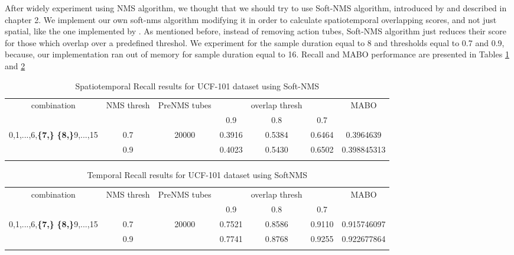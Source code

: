 After widely experiment using NMS algorithm, we thought that we should try to use Soft-NMS algorithm, introduced by \cite{DBLP:journals/corr/BodlaSCD17} and described in chapter 2. We implement our own soft-nms algorithm modifying it in order to calculate spatiotemporal overlapping
scores, and not just spatial, like the one implemented by \cite{DBLP:journals/corr/BodlaSCD17}. As mentioned before, instead of removing action tubes, Soft-NMS algorithm just reduces their score for those which overlap over a predefined threshol. We experiment for the sample duration
equal to 8 and thresholds equal to 0.7 and 0.9, because, our implementation ran out of memory for sample duration equal to 16.
Recall and MABO performance are presented in Tables \ref{table:ucf_softnms_recall} and \ref{table:ucf_softnms_temp_recall}

\begin{center}
  \setlength{\tabcolsep}{2pt}
\begin{longtable}{||c | c | c | c c c| c|}

  \hline
  \multirow{2}{*}{combination} & \multirow{2}{2.5em}{NMS thresh} & \multirow{2}{3.5em}{PreNMS tubes} &  {} &overlap thresh & {} & \multirow{2}{*}{MABO} \\
  {} & {} & {} &  0.9 &  0.8 & 0.7 & {}\\         
  \hline
  \multirow{2}{7em}{0,1,...,6,\textbf{\{7,\}}
  \textbf{\{8,\}}9,...,15 }  & 0.7 &\multirow{2}{*}{20000}  & 0.3916 & 0.5384 & 0.6464 & 0.3964639 \\
  \cline{2-2} \cline{4-7} 
  {} &  0.9   & {}   & 0.4023 & 0.5430 & 0.6502 & 0.398845313 \\
  \hline                                    

  \caption{Spatiotemporal Recall results for UCF-101 dataset using Soft-NMS}
  \label{table:ucf_softnms_recall}
\end{longtable} 
\end{center}

\begin{center}
  \setlength{\tabcolsep}{2.2pt}
\begin{longtable}{||c | c | c | c c c| c|}

  \hline
  \multirow{2}{*}{combination} & \multirow{2}{2.5em}{NMS thresh} & \multirow{2}{3.5em}{PreNMS tubes} &  {} &overlap thresh & {} & \multirow{2}{*}{MABO} \\
  {} & {} & {} &  0.9 &  0.8 & 0.7 & {}\\         
  \hline

  \multirow{2}{7em}{0,1,...,6,\textbf{\{7,\}}
    \textbf{\{8,\}}9,...,15 }  & 0.7 &\multirow{2}{*}{20000}  & 0.7521 & 0.8586 & 0.9110 & 0.915746097  \\
  \cline{2-2} \cline{4-7} 
  {} &  0.9   & {}   & 0.7741 & 0.8768 & 0.9255 & 0.922677864 \\
  \hline                                    

  \caption{Temporal Recall results for UCF-101 dataset using SoftNMS}
  \label{table:ucf_softnms_temp_recall}
\end{longtable} 
\end{center}

